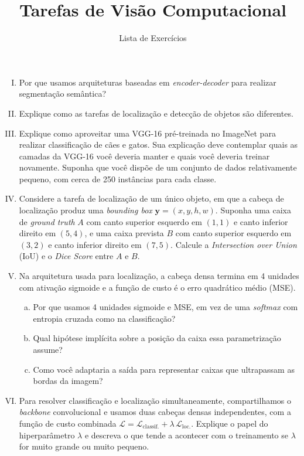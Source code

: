 \documentclass{dlproblemset}
\title{Tarefas de Visão Computacional}
\subtitle{Lista de Exercícios}
\begin{document}
\begin{enumerate}[I)]

\item Por que usamos arquiteturas baseadas em \textit{encoder-decoder} para realizar segmentação semântica?

\item Explique como as tarefas de localização e detecção de objetos são diferentes.

\item Explique como aproveitar uma VGG-16 pré-treinada no ImageNet para realizar classificação de cães e gatos. Sua explicação deve contemplar quais as camadas da VGG-16 você deveria manter e quais você deveria treinar novamente. Suponha que você dispõe de um conjunto de dados relativamente pequeno, com cerca de 250 instâncias para cada classe.

\item Considere a tarefa de localização de um único objeto, em que a cabeça de localização produz uma \textit{bounding box} $\mathbf{y} = (x, y, h, w)$. Suponha uma caixa de \textit{ground truth} $A$ com canto superior esquerdo em $(1, 1)$ e canto inferior direito em $(5, 4)$, e uma caixa prevista $B$ com canto superior esquerdo em $(3, 2)$ e canto inferior direito em $(7, 5)$. Calcule a \textit{Intersection over Union} (IoU) e o \textit{Dice Score} entre $A$ e $B$.

\item Na arquitetura usada para localização, a cabeça densa termina em 4 unidades com ativação sigmoide e a função de custo é o erro quadrático médio (MSE).
\begin{enumerate}[a)]
    \item Por que usamos 4 unidades sigmoide e MSE, em vez de uma \textit{softmax} com entropia cruzada como na classificação?
    \item Qual hipótese implícita sobre a posição da caixa essa parametrização assume?
    \item Como você adaptaria a saída para representar caixas que ultrapassam as bordas da imagem?
\end{enumerate}

\item Para resolver classificação e localização simultaneamente, compartilhamos o \textit{backbone} convolucional e usamos duas cabeças densas independentes, com a função de custo combinada $\mathcal{L} = \mathcal{L}_{\text{classif.}} + \lambda\,\mathcal{L}_{\text{loc.}}$. Explique o papel do hiperparâmetro $\lambda$ e descreva o que tende a acontecer com o treinamento se $\lambda$ for muito grande ou muito pequeno.


\end{enumerate}
\end{document}
